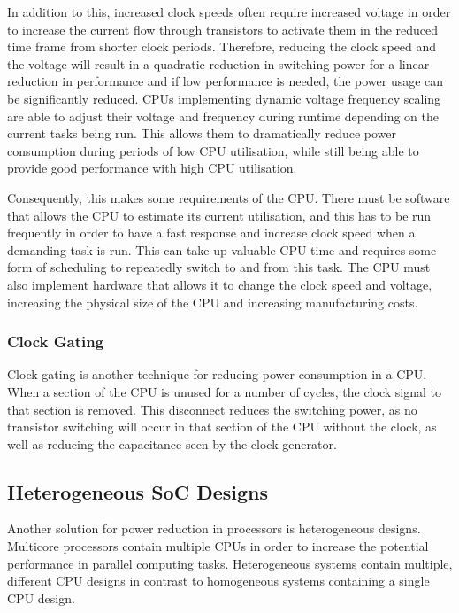In addition to this, increased clock speeds often require increased voltage in order to increase the current flow through transistors to activate them in the reduced time frame from shorter clock periods. Therefore, reducing the clock speed and the voltage will result in a quadratic reduction in switching power for a linear reduction in performance and if low performance is needed, the power usage can be significantly reduced. CPUs implementing dynamic voltage frequency scaling are able to adjust their voltage and frequency during runtime depending on the current tasks being run. This allows them to dramatically reduce power consumption during periods of low CPU utilisation, while still being able to provide good performance with high CPU utilisation\cite[chapter~1]{hennessey}.

Consequently, this makes some requirements of the CPU. There must be software that allows the CPU to estimate its current utilisation, and this has to be run frequently in order to have a fast response and increase clock speed when a demanding task is run. This can take up valuable CPU time and requires some form of scheduling to repeatedly switch to and from this task. The CPU must also implement hardware that allows it to change the clock speed and voltage, increasing the physical size of the CPU and increasing manufacturing costs.

\subsubsection{Clock Gating}
Clock gating is another technique for reducing power consumption in a CPU. When a section of the CPU is unused for a number of cycles, the clock signal to that section is removed. This disconnect reduces the switching power, as no transistor switching will occur in that section of the CPU without the clock, as well as reducing the capacitance seen by the clock generator\cite[chapter~1]{hennessey}.

\subsection{Heterogeneous SoC Designs}
\label{sec:het_designs}
Another solution for power reduction in processors is heterogeneous designs. Multicore processors contain multiple CPUs in order to increase the potential performance in parallel computing tasks. Heterogeneous systems contain multiple, different CPU designs in contrast to homogeneous systems containing a single CPU design\cite{heterogeneous-multicore}\cite[chapter~7]{digitaldesign}.

